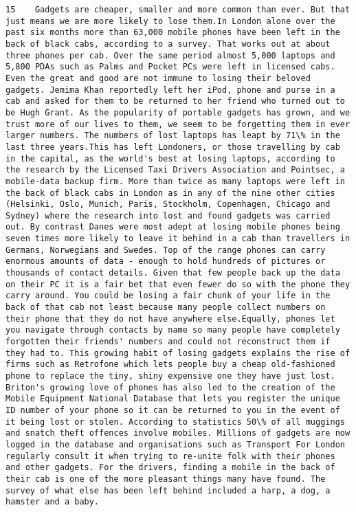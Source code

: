 \documentclass[11pt]{article}
\begin{document}
\begin{Verbatim}[commandchars=\\\{\}]
         15    Gadgets are cheaper, smaller and more common than ever. But that just means we are more likely to lose them.In London alone over the past six months more than 63,000 mobile phones have been left in the back of black cabs, according to a survey. That works out at about three phones per cab. Over the same period almost 5,000 laptops and 5,800 PDAs such as Palms and Pocket PCs were left in licensed cabs. Even the great and good are not immune to losing their beloved gadgets. Jemima Khan reportedly left her iPod, phone and purse in a cab and asked for them to be returned to her friend who turned out to be Hugh Grant. As the popularity of portable gadgets has grown, and we trust more of our lives to them, we seem to be forgetting them in ever larger numbers. The numbers of lost laptops has leapt by 71\% in the last three years.This has left Londoners, or those travelling by cab in the capital, as the world's best at losing laptops, according to the research by the Licensed Taxi Drivers Association and Pointsec, a mobile-data backup firm. More than twice as many laptops were left in the back of black cabs in London as in any of the nine other cities (Helsinki, Oslo, Munich, Paris, Stockholm, Copenhagen, Chicago and Sydney) where the research into lost and found gadgets was carried out. By contrast Danes were most adept at losing mobile phones being seven times more likely to leave it behind in a cab than travellers in Germans, Norwegians and Swedes. Top of the range phones can carry enormous amounts of data - enough to hold hundreds of pictures or thousands of contact details. Given that few people back up the data on their PC it is a fair bet that even fewer do so with the phone they carry around. You could be losing a fair chunk of your life in the back of that cab not least because many people collect numbers on their phone that they do not have anywhere else.Equally, phones let you navigate through contacts by name so many people have completely forgotten their friends' numbers and could not reconstruct them if they had to. This growing habit of losing gadgets explains the rise of firms such as Retrofone which lets people buy a cheap old-fashioned phone to replace the tiny, shiny expensive one they have just lost. Briton's growing love of phones has also led to the creation of the Mobile Equipment National Database that lets you register the unique ID number of your phone so it can be returned to you in the event of it being lost or stolen. According to statistics 50\% of all muggings and snatch theft offences involve mobiles. Millions of gadgets are now logged in the database and organisations such as Transport For London regularly consult it when trying to re-unite folk with their phones and other gadgets. For the drivers, finding a mobile in the back of their cab is one of the more pleasant things many have found. The survey of what else has been left behind included a harp, a dog, a hamster and a baby.                                                                                                                                                                                                                                                                                                                                      
\end{Verbatim}
\end{document}
